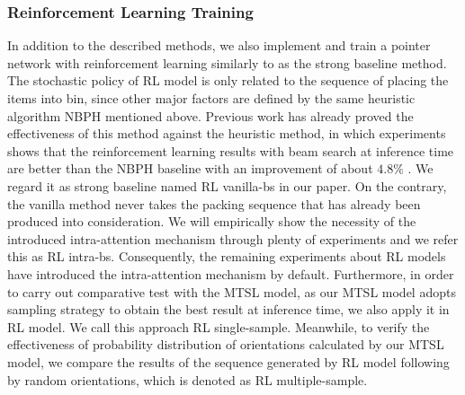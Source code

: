 \subsubsection{Reinforcement Learning Training}
In addition to the described methods, we also implement and train a pointer network with reinforcement learning similarly to \cite{Hu2017Solving} as the strong baseline method.
The stochastic policy of RL model is only related to the sequence of placing the items into bin, since other major factors are defined by the same heuristic algorithm NBPH mentioned above.
Previous work has already proved the effectiveness of this method against the heuristic method,
in which experiments shows that the reinforcement learning results with beam search at inference time are better than the NBPH baseline with an improvement of about $4.8\%$ \cite{Hu2017Solving}.
We regard it as strong baseline named RL vanilla-bs in our paper.
On the contrary, the vanilla method never takes the packing sequence that has already been produced into consideration.
We will empirically show the necessity of the introduced intra-attention mechanism through plenty of experiments and we refer this as RL intra-bs.
Consequently, the remaining experiments about RL models have introduced the intra-attention mechanism by default.
Furthermore, in order to carry out comparative test with the MTSL model, as our MTSL model adopts sampling strategy to obtain the best result at inference time, we also apply it in RL model. We call this approach RL single-sample. Meanwhile, to verify the effectiveness of probability distribution of orientations calculated by our MTSL model, we compare the results of the sequence generated by RL model following by random orientations, which is denoted as RL multiple-sample. %

